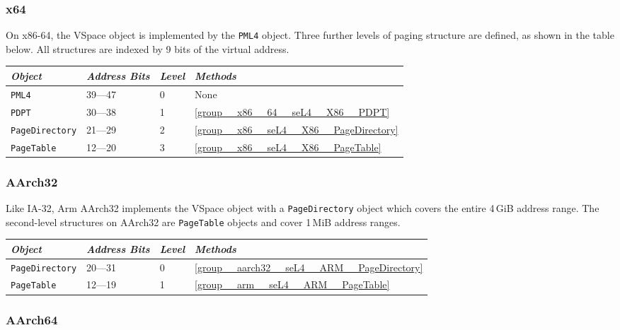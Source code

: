 \subsubsection{x64}

On x86-64, the VSpace object is implemented by the \texttt{PML4} object. Three further levels of
paging structure are defined, as shown in the table below. All structures are indexed by 9 bits of
the virtual address.

\begin{tabularx}{\textwidth}{Xlll} \toprule
\emph{Object}          & \emph{Address Bits} & \emph{Level} & \emph{Methods} \\ \midrule
\texttt{PML4}          & 39---47             & 0            & None \\
\texttt{PDPT}          & 30---38             & 1            & \autoref{group__x86__64__seL4__X86__PDPT} \\
\texttt{PageDirectory} & 21---29             & 2            & \autoref{group__x86__seL4__X86__PageDirectory} \\
\texttt{PageTable}     & 12---20             & 3            & \autoref{group__x86__seL4__X86__PageTable} \\
\bottomrule
\end{tabularx}

\subsubsection{AArch32}

Like IA-32, Arm AArch32 implements the VSpace object with a \texttt{PageDirectory} object which
covers the entire 4\,GiB address range.  The second-level structures on AArch32 are
\texttt{PageTable} objects and cover 1\,MiB address ranges.

\begin{tabularx}{\textwidth}{Xlll} \toprule
\emph{Object}          & \emph{Address Bits} & \emph{Level} & \emph{Methods} \\ \midrule
\texttt{PageDirectory} & 20---31             & 0            & \autoref{group__aarch32__seL4__ARM__PageDirectory} \\
\texttt{PageTable}     & 12---19             & 1            & \autoref{group__arm__seL4__ARM__PageTable} \\
\bottomrule
\end{tabularx}

\subsubsection{AArch64}

